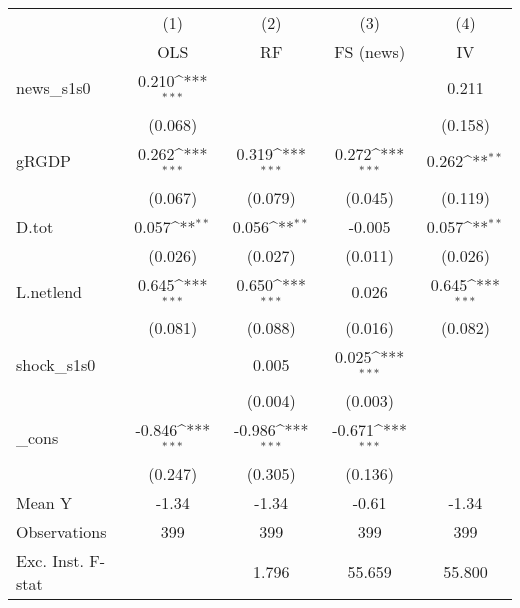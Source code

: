 {
\def\sym#1{\ifmmode^{#1}\else\(^{#1}\)\fi}
\begin{tabular}{l*{4}{c}}
\toprule
            &\multicolumn{1}{c}{(1)}&\multicolumn{1}{c}{(2)}&\multicolumn{1}{c}{(3)}&\multicolumn{1}{c}{(4)}\\
            &\multicolumn{1}{c}{OLS}&\multicolumn{1}{c}{RF}&\multicolumn{1}{c}{FS (news)}&\multicolumn{1}{c}{IV}\\
\midrule
news\_s1s0   &       0.210\sym{***}&                     &                     &       0.211         \\
            &     (0.068)         &                     &                     &     (0.158)         \\
\addlinespace
gRGDP       &       0.262\sym{***}&       0.319\sym{***}&       0.272\sym{***}&       0.262\sym{**} \\
            &     (0.067)         &     (0.079)         &     (0.045)         &     (0.119)         \\
\addlinespace
D.tot       &       0.057\sym{**} &       0.056\sym{**} &      -0.005         &       0.057\sym{**} \\
            &     (0.026)         &     (0.027)         &     (0.011)         &     (0.026)         \\
\addlinespace
L.netlend   &       0.645\sym{***}&       0.650\sym{***}&       0.026         &       0.645\sym{***}\\
            &     (0.081)         &     (0.088)         &     (0.016)         &     (0.082)         \\
\addlinespace
shock\_s1s0  &                     &       0.005         &       0.025\sym{***}&                     \\
            &                     &     (0.004)         &     (0.003)         &                     \\
\addlinespace
\_cons      &      -0.846\sym{***}&      -0.986\sym{***}&      -0.671\sym{***}&                     \\
            &     (0.247)         &     (0.305)         &     (0.136)         &                     \\
\midrule
Mean Y      &       -1.34         &       -1.34         &       -0.61         &       -1.34         \\
Observations&         399         &         399         &         399         &         399         \\
Exc. Inst. F-stat&                     &       1.796         &      55.659         &      55.800         \\
\bottomrule
\end{tabular}
}
